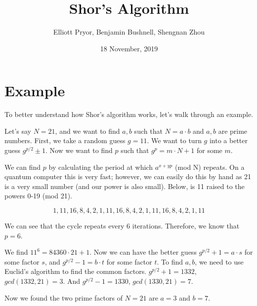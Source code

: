 \documentclass[a4paper]{article}
\title{Shor's Algorithm}
\author{Elliott Pryor, Benjamin Bushnell, Shengnan Zhou}
\date{18 November, 2019}
\begin{document}
\maketitle %


\section{Example}
To better understand how Shor's algorithm works, let's walk through an example.

Let's say $N=21$, and we want to find $a, b$ such that $N = a \cdot b$ and $a, b$ are prime numbers.
First, we take a random guess $g=11$. We want to turn $g$ into a better guess $g^{p/2} \pm 1$. Now we want to find $p$ such that $g^p = m \cdot N + 1$ for some $m$.

We can find $p$ by calculating the period at which $a ^{x+ yp}$ (mod N) repeats. On a quantum computer this is very fast; however, we can easily do this by hand as 21 is a very small number (and our power is also small). Below, is 11 raised to the powers 0-19 (mod 21).

$$1, 11, 16, 8, 4, 2, 1, 11, 16, 8, 4, 2, 1, 11, 16, 8, 4, 2, 1, 11$$ 

We can see that the cycle repeats every 6 iterations. Therefore, we know that $p = 6$.

We find $11^ 6 = 84360 \cdot 21 + 1$. Now we can have the better guess $g^{p/2} + 1 = a \cdot s$ for some factor $s$, and $g^{p/2} - 1 = b \cdot t$ for some factor $t$. To find $a,b$, we need to use Euclid's algorithm to find the common factors. 
$g^{p/2} + 1 = 1332$, $gcd(1332, 21) = 3$. And $g^{p/2} - 1 = 1330$, $gcd(1330, 21) = 7$. 

Now we found the two prime factors of $N=21$ are $a = 3$ and $b = 7$.
\end{document}
